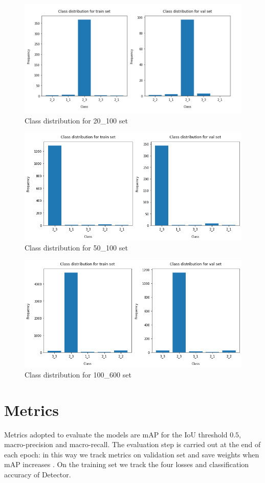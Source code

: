 \documentclass[a4paper,10pt]{report}
\begin{document}
\begin{figure}[h]
  \center
  \includegraphics[width=0.65\linewidth]{20_100.png}
  \caption{Class distribution for 20_100 set}
  \label{fig:20_100}
\end{figure}
\begin{figure}[h]
  \center
  \includegraphics[width=0.65\linewidth]{50_100.png}
  \caption{Class distribution for 50_100 set}
  \label{fig:50_100}
\end{figure}
\begin{figure}[h]
  \center
  \includegraphics[width=0.65\linewidth]{100_600.png}
  \caption{Class distribution for 100_600 set}
  \label{fig:100_600}
\end{figure}

\section{Metrics}
Metrics adopted to evaluate the models are mAP for the IoU threshold $0.5$, macro-precision and macro-recall.
The evaluation step is carried out at the end of each epoch: in this way we track metrics on validation set and save weights when mAP increases \cite{mAP}.
On the training set we track the four losses and classification accuracy of Detector.
\end{document}
